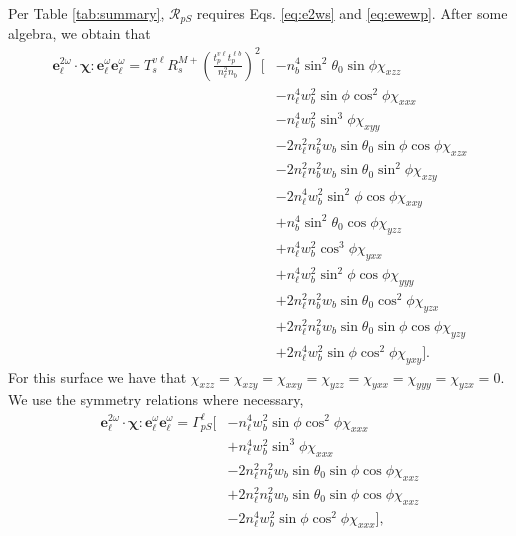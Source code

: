 \documentclass{article}
\begin{document}
Per Table \ref{tab:summary}, $\mathcal{R}_{pS}$ requires Eqs. \eqref{eq:e2ws}
and \eqref{eq:ewewp}. After some algebra, we obtain that
\begin{equation*}
\begin{split}
\mathbf{e}^{2\omega}_{\ell}\cdot\boldsymbol{\chi}:
\mathbf{e}^{\omega}_{\ell}\mathbf{e}^{\omega}_{\ell}
= T_{s}^{v\ell}R^{M+}_{s}
\left(\frac{t^{v\ell}_{p}t^{\ell b}_{p}}
{n^{2}_{\ell}n_{b}}\right)^{2}
\big[
&- n^{4}_{b}\sin^{2}\theta_{0}\sin\phi\chi_{xzz}\\
&- n^{4}_{\ell}w^{2}_{b}\sin\phi\cos^{2}\phi\chi_{xxx}\\
&- n^{4}_{\ell}w^{2}_{b}\sin^{3}\phi\chi_{xyy}\\
&- 2n^{2}_{\ell}n^{2}_{b}w_{b}\sin\theta_{0}\sin\phi\cos\phi\chi_{xzx}\\
&- 2n^{2}_{\ell}n^{2}_{b}w_{b}\sin\theta_{0}\sin^{2}\phi\chi_{xzy}\\
&- 2n^{4}_{\ell}w^{2}_{b}\sin^{2}\phi\cos\phi\chi_{xxy}\\
&+ n^{4}_{b}\sin^{2}\theta_{0}\cos\phi\chi_{yzz}\\
&+ n^{4}_{\ell}w^{2}_{b}\cos^{3}\phi\chi_{yxx}\\
&+ n^{4}_{\ell}w^{2}_{b}\sin^{2}\phi\cos\phi\chi_{yyy}\\
&+ 2n^{2}_{\ell}n^{2}_{b}w_{b}\sin\theta_{0}\cos^{2}\phi\chi_{yzx}\\
&+ 2n^{2}_{\ell}n^{2}_{b}w_{b}\sin\theta_{0}\sin\phi\cos\phi\chi_{yzy}\\
&+ 2n^{4}_{\ell}w^{2}_{b}\sin\phi\cos^{2}\phi\chi_{yxy}
\big].
\end{split}
\end{equation*}
For this surface we have that
$\chi_{xzz}=\chi_{xzy}=\chi_{xxy}=\chi_{yzz}=\chi_{yxx}=\chi_{yyy}=
\chi_{yzx}=0$. We use the symmetry relations where necessary,
\begin{equation*}
\begin{split}
\mathbf{e}^{2\omega}_{\ell}\cdot\boldsymbol{\chi}:
\mathbf{e}^{\omega}_{\ell}\mathbf{e}^{\omega}_{\ell} =
\Gamma^{\ell}_{pS}
\big[
&- n^{4}_{\ell}w^{2}_{b}\sin\phi\cos^{2}\phi\chi_{xxx}\\
&+ n^{4}_{\ell}w^{2}_{b}\sin^{3}\phi\chi_{xxx}\\
&- 2n^{2}_{\ell}n^{2}_{b}w_{b}\sin\theta_{0}\sin\phi\cos\phi\chi_{xxz}\\
&+ 2n^{2}_{\ell}n^{2}_{b}w_{b}\sin\theta_{0}\sin\phi\cos\phi\chi_{xxz}\\
&- 2n^{4}_{\ell}w^{2}_{b}\sin\phi\cos^{2}\phi\chi_{xxx}
\big],
\end{split}
\end{equation*}
\end{document}
